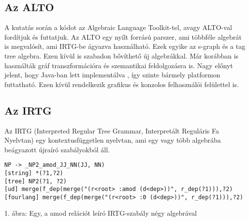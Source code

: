 \subsection{Az ALTO}
A kutatás során a kódot az Algebraic Language Toolkit-tel, avagy ALTO-val fordítjuk és futtatjuk. Az ALTO egy nyílt forrású parszer, ami többféle algebrát is megvalósít, ami IRTG-be ágyazva használható.
Ezek egyike az s-graph és a tag tree algebra. Ezen kívül is szabadon bővíthető új algebrákkal. Már korábban is használták gráf transzformációra és szemantikai feldolgozásra is. Nagy előnyt jelent, hogy Java-ban lett implementálva , így szinte bármely platformon futtatható. Ezen kívül rendelkezik grafikus és konzolos felhasználói felülettel is.


\subsection{Az IRTG}
Az IRTG (Interpreted Regular Tree Grammar, Interpretált Reguláris Fa Nyelvtan) egy kontextusfüggetlen nyelvtan, ami egy vagy több algebrába beágyazott újraíró szabályokból áll.
\begin{verbatim}
NP -> _NP2_amod_JJ_NN(JJ, NN)
[string] *(?1,?2)
[tree] NP2(?1, ?2)
[ud] merge(f_dep(merge("(r<root> :amod (d<dep>))", r_dep(?1))),?2)
[fourlang] merge(f_dep(merge("(r<root> :0 (d<dep>))", r_dep(?1))),?2)
\end{verbatim}

1. ábra: Egy, a amod relációt leíró IRTG-szabály négy algebrával

